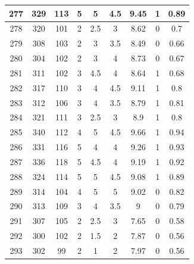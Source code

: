 \documentclass[11pt]{article}
\begin{document}
\begin{appendix}
\begin{longtable}[H]{|c|c|c|c|c|c|c|c|c|}
	277        & 329       & 113         & 5                 & 5   & 4.5 & 9.45 & 1        & 0.89            \\ \hline
	278        & 320       & 101         & 2                 & 2.5 & 3   & 8.62 & 0        & 0.7             \\ \hline
	279        & 308       & 103         & 2                 & 3   & 3.5 & 8.49 & 0        & 0.66            \\ \hline
	280        & 304       & 102         & 2                 & 3   & 4   & 8.73 & 0        & 0.67            \\ \hline
	281        & 311       & 102         & 3                 & 4.5 & 4   & 8.64 & 1        & 0.68            \\ \hline
	282        & 317       & 110         & 3                 & 4   & 4.5 & 9.11 & 1        & 0.8             \\ \hline
	283        & 312       & 106         & 3                 & 4   & 3.5 & 8.79 & 1        & 0.81            \\ \hline
	284        & 321       & 111         & 3                 & 2.5 & 3   & 8.9  & 1        & 0.8             \\ \hline
	285        & 340       & 112         & 4                 & 5   & 4.5 & 9.66 & 1        & 0.94            \\ \hline
	286        & 331       & 116         & 5                 & 4   & 4   & 9.26 & 1        & 0.93            \\ \hline
	287        & 336       & 118         & 5                 & 4.5 & 4   & 9.19 & 1        & 0.92            \\ \hline
	288        & 324       & 114         & 5                 & 5   & 4.5 & 9.08 & 1        & 0.89            \\ \hline
	289        & 314       & 104         & 4                 & 5   & 5   & 9.02 & 0        & 0.82            \\ \hline
	290        & 313       & 109         & 3                 & 4   & 3.5 & 9    & 0        & 0.79            \\ \hline
	291        & 307       & 105         & 2                 & 2.5 & 3   & 7.65 & 0        & 0.58            \\ \hline
	292        & 300       & 102         & 2                 & 1.5 & 2   & 7.87 & 0        & 0.56            \\ \hline
	293        & 302       & 99          & 2                 & 1   & 2   & 7.97 & 0        & 0.56            \\ \hline

\end{longtable}
\end{appendix}
\end{document}
